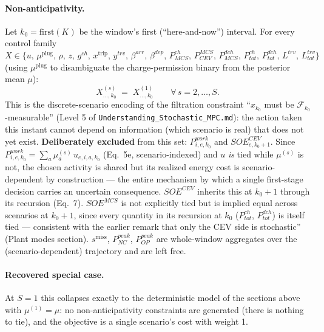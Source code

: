 \documentclass[11pt]{article}
\begin{document}
\paragraph{Non-anticipativity.} Let $k_0=\text{first}(K)$ be the window's first (``here-and-now'')
interval. For every control family $X\in\{u,\,\mu^{\text{plug}},\,\rho,\,z,\,g^{ch},\,x^{\text{trip}},\,
y^{trv},\,\beta^{arr},\,\beta^{dep},\,P^{ch}_{MCS},\,P^{MCS}_{CEV},\,P^{dch}_{MCS},\,P^{ch}_{tot},\,
P^{dch}_{tot},\,L^{trv},\,L^{trv}_{tot}\}$ (using $\mu^{\text{plug}}$ to disambiguate the
charge-permission binary from the posterior mean $\mu$):
\[
  X^{(s)}_{\dots,k_0} \;=\; X^{(1)}_{\dots,k_0} \qquad \forall\, s = 2,\dots,S.
\]
This is the discrete-scenario encoding of the filtration constraint ``$x_{k_0}$ must be
$\mathcal F_{k_0}$-measurable'' (Level 5 of \texttt{Understanding\_Stochastic\_MPC.md}): the
action taken this instant cannot depend on information (which scenario is real) that does not
yet exist. \textbf{Deliberately excluded} from this set: $P^{work}_{i,e,k_0}$ and
$SOE^{CEV}_{e,k_0+1}$. Since $P^{work}_{i,e,k_0}=\sum_a \mu^{(s)}_a\, u_{e,i,a,k_0}$ (Eq.~5e,
scenario-indexed) and $u$ \emph{is} tied while $\mu^{(s)}$ is not, the chosen activity is shared
but its realized energy cost is scenario-dependent by construction — the entire mechanism by
which a single first-stage decision carries an uncertain consequence. $SOE^{CEV}$ inherits this
at $k_0+1$ through its recursion (Eq.~7). $SOE^{MCS}$ is not explicitly tied but is implied
equal across scenarios at $k_0+1$, since every quantity in its recursion at $k_0$ ($P^{ch}_{tot}$,
$P^{dch}_{tot}$) is itself tied — consistent with the earlier remark that only the CEV side is
stochastic'' (Plant modes section). $s^{\text{miss}}$, $P^{peak}_{NC}$, $P^{peak}_{OP}$ are whole-window aggregates over
the (scenario-dependent) trajectory and are left free.

\paragraph{Recovered special case.} At $S=1$ this collapses exactly to the deterministic model
of the sections above with $\mu^{(1)}=\mu$: no non-anticipativity constraints are
generated (there is nothing to tie), and the objective is a single scenario's cost with weight 1.
\end{document}

